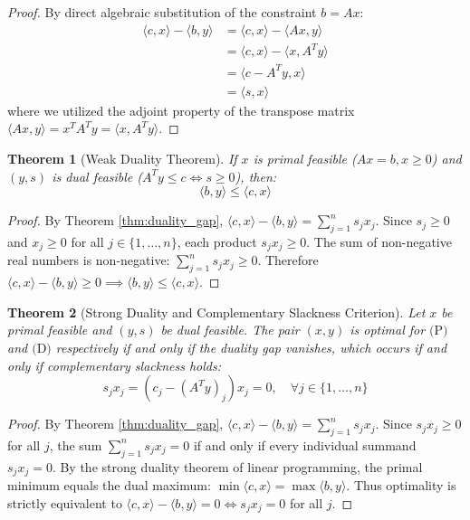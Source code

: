 \documentclass[11pt,a4paper]{article}
\newtheorem{theorem}{Theorem}[section]
\theoremstyle{definition}
\begin{document}
\begin{proof}
By direct algebraic substitution of the constraint $b = A x$:
\begin{align*}
\langle c, x \rangle - \langle b, y \rangle &= \langle c, x \rangle - \langle A x, y \rangle \\
&= \langle c, x \rangle - \langle x, A^T y \rangle \\
&= \langle c - A^T y, x \rangle \\
&= \langle s, x \rangle
\end{align*}
where we utilized the adjoint property of the transpose matrix $\langle A x, y \rangle = x^T A^T y = \langle x, A^T y \rangle$.
\end{proof}

\begin{theorem}[Weak Duality Theorem]\label{thm:weak_duality}
If $x$ is primal feasible ($A x = b, x \ge 0$) and $(y, s)$ is dual feasible ($A^T y \le c \iff s \ge 0$), then:
\begin{equation}\label{eq:weak_duality_ineq}
\langle b, y \rangle \le \langle c, x \rangle
\end{equation}
\end{theorem}

\begin{proof}
By Theorem \ref{thm:duality_gap}, $\langle c, x \rangle - \langle b, y \rangle = \sum_{j=1}^n s_j x_j$.
Since $s_j \ge 0$ and $x_j \ge 0$ for all $j \in \{1, \dots, n\}$, each product $s_j x_j \ge 0$.
The sum of non-negative real numbers is non-negative: $\sum_{j=1}^n s_j x_j \ge 0$.
Therefore $\langle c, x \rangle - \langle b, y \rangle \ge 0 \implies \langle b, y \rangle \le \langle c, x \rangle$.
\end{proof}

\begin{theorem}[Strong Duality and Complementary Slackness Criterion]\label{thm:strong_duality}
Let $x$ be primal feasible and $(y, s)$ be dual feasible. The pair $(x, y)$ is optimal for $\text{(P)}$ and $\text{(D)}$ respectively if and only if the duality gap vanishes, which occurs if and only if complementary slackness holds:
\begin{equation}\label{eq:comp_slackness}
s_j x_j = (c_j - (A^T y)_j) x_j = 0, \quad \forall j \in \{1, \dots, n\}
\end{equation}
\end{theorem}

\begin{proof}
By Theorem \ref{thm:duality_gap}, $\langle c, x \rangle - \langle b, y \rangle = \sum_{j=1}^n s_j x_j$.
Since $s_j x_j \ge 0$ for all $j$, the sum $\sum_{j=1}^n s_j x_j = 0$ if and only if every individual summand $s_j x_j = 0$.
By the strong duality theorem of linear programming, the primal minimum equals the dual maximum: $\min \langle c, x \rangle = \max \langle b, y \rangle$.
Thus optimality is strictly equivalent to $\langle c, x \rangle - \langle b, y \rangle = 0 \iff s_j x_j = 0$ for all $j$.
\end{proof}
\end{document}
